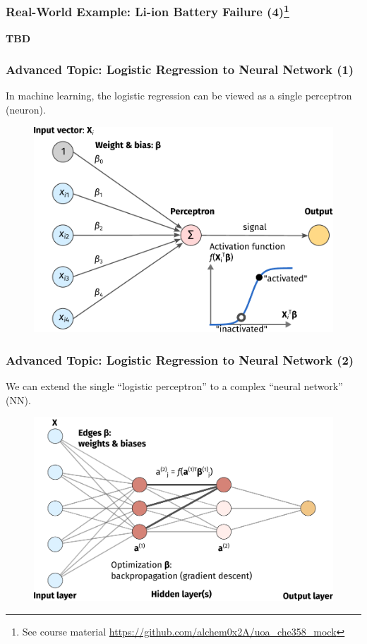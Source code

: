 \documentclass[10pt,aspectratio=169]{beamer}
\begin{document}
      \begin{frame}
        \frametitle{Real-World Example: Li-ion Battery Failure
          (4)\let\thefootnote\relax\footnote{{\scriptsize See course
              material
              \url{https://github.com/alchem0x2A/uoa_che358_mock}}}}

        \textbf{TBD}
        
        
      \end{frame}

      \begin{frame}
        \frametitle{Advanced Topic: Logistic Regression to Neural
          Network (1)}
        In machine learning, the logistic regression can be viewed as
        a single perceptron (neuron).

        \begin{figure}[t]
          \includegraphics[width=0.65\linewidth]{images/nn-1.pdf}
        \end{figure}

        
      \end{frame}

      \begin{frame}
        \frametitle{Advanced Topic: Logistic Regression to Neural
          Network (2)}
        We can extend the single ``logistic perceptron'' to a complex
        ``neural network'' (NN).

        \begin{figure}[t]
          \includegraphics[width=0.85\linewidth]{images/nn-2.pdf}
        \end{figure}
        
      \end{frame}
\end{document}
